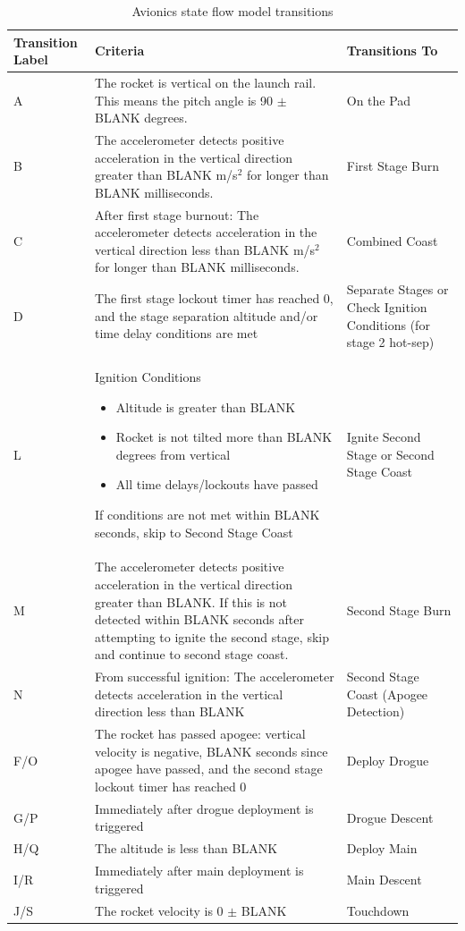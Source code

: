 \begin{table}
    \centering
    \small
    \setlength{\offset}{\baselineskip}
    \begin{longtable}{>{\raggedright\arraybackslash}p{1.5cm} >{\raggedright\arraybackslash}p{10cm} >{\raggedright\arraybackslash}p{3cm}}
        \toprule
            \textbf{Transition Label} & \textbf{Criteria} & \textbf{Transitions To} \\
        \midrule
            A & The rocket is vertical on the launch rail. This means the pitch angle is 90 \(\pm\) BLANK degrees. & On the Pad \\
            B & The accelerometer detects positive acceleration in the vertical direction greater than BLANK m/s\(^2\) for longer than BLANK milliseconds. & First Stage Burn \\
            C & After first stage burnout: The accelerometer detects acceleration in the vertical direction less than BLANK m/s\(^2\) for longer than BLANK milliseconds. & Combined Coast \\
            D & The first stage lockout timer has reached 0, and the stage separation altitude and/or time delay conditions are met & Separate Stages or Check Ignition Conditions (for stage 2 hot-sep) \\
            L & Ignition Conditions \begin{itemize} \item Altitude is greater than BLANK \item Rocket is not tilted more than BLANK degrees from vertical \item All time delays/lockouts have passed \end{itemize} If conditions are not met within BLANK seconds, skip to Second Stage Coast & Ignite Second Stage or Second Stage Coast \\
            M & The accelerometer detects positive acceleration in the vertical direction greater than BLANK. If this is not detected within BLANK seconds after attempting to ignite the second stage, skip and continue to second stage coast. & Second Stage Burn \\
            N & From successful ignition: The accelerometer detects acceleration in the vertical direction less than BLANK & Second Stage Coast (Apogee Detection) \\
            F/O & The rocket has passed apogee: vertical velocity is negative, BLANK seconds since apogee have passed, and the second stage lockout timer has reached 0 & Deploy Drogue \\
            G/P & Immediately after drogue deployment is triggered & Drogue Descent \\
            H/Q & The altitude is less than BLANK & Deploy Main \\
            I/R & Immediately after main deployment is triggered & Main Descent \\
            J/S & The rocket velocity is 0 \(\pm\) BLANK & Touchdown \\
        \bottomrule
    \end{longtable}
    \caption{Avionics state flow model transitions}
    \label{table:av-state-transitions}
\end{table}


